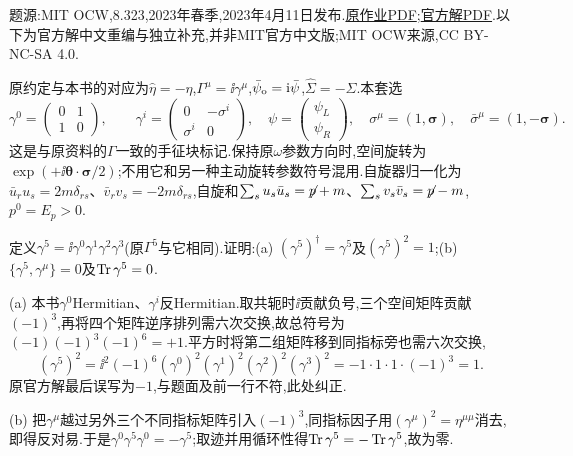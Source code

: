 题源:MIT OCW,8.323,2023年春季,2023年4月11日发布.\href{https://ocw.mit.edu/courses/8-323-relativistic-quantum-field-theory-i-spring-2023/mit8_323_s23_pset09.pdf}{原作业PDF};\href{https://ocw.mit.edu/courses/8-323-relativistic-quantum-field-theory-i-spring-2023/mit8_323_s23_pset_09sol.pdf}{官方解PDF}.以下为官方解中文重编与独立补充,并非MIT官方中文版;MIT OCW来源,CC BY-NC-SA 4.0.

原约定与本书的对应为$\widehat\eta=-\eta$,$\Gamma^\mu=\ii\gamma^\mu$,$\bar\psi_{\rm o}=\ii\bar\psi$,$\widehat\Sigma=-\Sigma$.本套选
\[
 \gamma^0=\begin{pmatrix}0&1\\1&0\end{pmatrix},\qquad
 \gamma^i=\begin{pmatrix}0&-\sigma^i\\\sigma^i&0\end{pmatrix},\quad
 \psi=\begin{pmatrix}\psi_L\\\psi_R\end{pmatrix},\quad
 \sigma^\mu=(1,\boldsymbol\sigma),\quad\bar\sigma^\mu=(1,-\boldsymbol\sigma).
\]
这是与原资料的$\Gamma$一致的手征块标记.保持原$\omega$参数方向时,空间旋转为$\exp(+\ii\boldsymbol\theta\cdot\boldsymbol\sigma/2)$;不用它和另一种主动旋转参数符号混用.自旋器归一化为$\bar u_ru_s=2m\delta_{rs}$、$\bar v_rv_s=-2m\delta_{rs}$,自旋和$\sum_su_s\bar u_s=\slashed p+m$、$\sum_sv_s\bar v_s=\slashed p-m$,$p^0=E_p>0$.

\begin{exercise}
定义$\gamma^5=\ii\gamma^0\gamma^1\gamma^2\gamma^3$(原$\Gamma^5$与它相同).证明:(a) $(\gamma^5)^\dagger=\gamma^5$及$(\gamma^5)^2=1$;(b) $\{\gamma^5,\gamma^\mu\}=0$及$\Tr\gamma^5=0$.
\end{exercise}
\begin{solution}
(a) 本书$\gamma^0$Hermitian、$\gamma^i$反Hermitian.取共轭时$\ii$贡献负号,三个空间矩阵贡献$(-1)^3$,再将四个矩阵逆序排列需六次交换,故总符号为$(-1)(-1)^3(-1)^6=+1$.平方时将第二组矩阵移到同指标旁也需六次交换,
\[
 (\gamma^5)^2=\ii^2(-1)^6(\gamma^0)^2(\gamma^1)^2(\gamma^2)^2(\gamma^3)^2
 =-1\cdot1\cdot1\cdot(-1)^3=1.
\]
原官方解最后误写为$-1$,与题面及前一行不符,此处纠正.

(b) 把$\gamma^\mu$越过另外三个不同指标矩阵引入$(-1)^3$,同指标因子用$(\gamma^\mu)^2=\eta^{\mu\mu}$消去,即得反对易.于是$\gamma^0\gamma^5\gamma^0=-\gamma^5$;取迹并用循环性得$\Tr\gamma^5=-\Tr\gamma^5$,故为零.
\end{solution}


